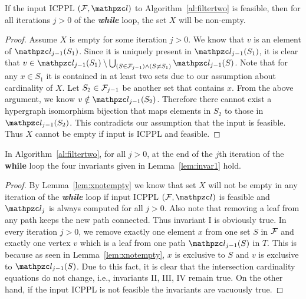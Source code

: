 \begin{lemma}
  \label{lem:xnotempty}
  If the input ICPPL $(\cF, \cl)$ to Algorithm~\ref{al:filtertwo} is
  feasible, then for all iterations $j > 0$ of the {\em \bf while}
  loop, the set $X$ will be non-empty.
\end{lemma}
\begin{proof}\thesisspacing
  Assume $X$ is empty for some iteration $j > 0$. We know that $v$ is
  an element of $\cl_{j-1}(S_1)$. Since it is uniquely present in
  $\cl_{j-1}(S_1)$, it is clear that $v \in \cl_{j-1}(S_1) \setminus
  \bigcup_{(S \in \cF_{j-1}) \wedge (S \ne S_1)}\cl_{j-1}(S)$.  Note
  that for any $x \in S_1$ it is contained in at least two sets due to
  our assumption about cardinality of $X$. Let $S_2 \in {\cal F}_{j-1}$ be
  another set that contains $x$. From the above argument, we know $v
  \notin \cl_{j-1}(S_2)$. Therefore there cannot exist a hypergraph
  isomorphism bijection that maps elements in $S_2$ to those in
  $\cl_{j-1}(S_2)$. This contradicts our assumption that the input is
  feasible. Thus $X$ cannot be empty if input is ICPPL and feasible.
\end{proof}

\begin{lemma}
  \label{lem:invar3}
  In Algorithm~\ref{al:filtertwo}, for all $j > 0$, at the end of the
  $j$th iteration of the {\bf while} loop the four invariants given in
  Lemma~\ref{lem:invar1} hold.
\end{lemma}
\begin{proof}\thesisspacing
  By Lemma~\ref{lem:xnotempty} we know that set $X$ will not be empty
  in any iteration of the {\em \bf while} loop if input ICPPL $(\cF,
  \cl)$ is feasible and $\cl_j$ is always computed for all $j >
  0$. Also note that removing a leaf from any path keeps the new path
  connected. Thus invariant I is obviously true. In every iteration $j
  > 0$, we remove exactly one element $x$ from one set $S$ in ${\cal F}$
  and exactly one vertex $v$ which is a leaf from one path
  $\cl_{j-1}(S)$ in $T$. This is because as seen in
  Lemma~\ref{lem:xnotempty}, $x$ is exclusive to $S$ and $v$ is
  exclusive to $\cl_{j-1}(S)$. Due to this fact, it is clear that the
  intersection cardinality equations do not change, i.e., invariants
  II, III, IV remain true. On the other hand, if the input ICPPL is
  not feasible the invariants are vacuously true. %
\end{proof}


